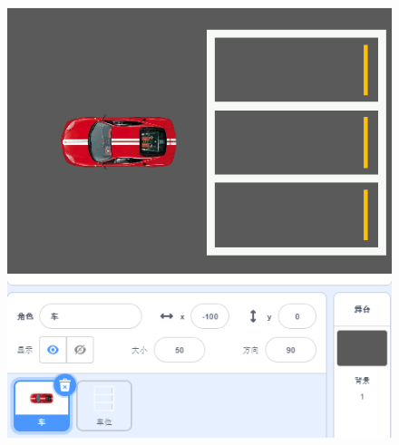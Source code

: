 \documentclass[10pt, a4paper]{article}
\begin{document}
\begin{enumerate}
        \begin{figure}[htbp]
            \centering
            \begin{minipage}[t]{.28\textwidth}
                \centering
                \begin{minipage}[t]{.5\textwidth}
                    \centering
                    \includegraphics[width=\textwidth]{figure/10-1.png}
                \end{minipage}
                \begin{minipage}[t]{.4\textwidth}
                    \centering

\end{minipage}
\end{minipage}
\end{figure}
\end{enumerate}
\end{document}
